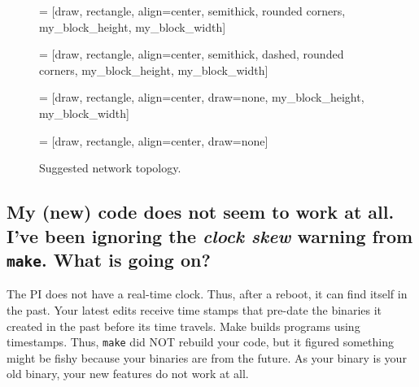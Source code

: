 \documentclass{article}
\begin{document}
\begin{figure}[h!]
 = [draw, rectangle, align=center, semithick, rounded corners,
  my_block_height, my_block_width]

 = [draw, rectangle, align=center, semithick, dashed, rounded corners,
  my_block_height, my_block_width]

 = [draw, rectangle, align=center, draw=none,
  my_block_height, my_block_width]

 = [draw, rectangle, align=center, draw=none]

 \caption{Suggested network topology.}
  \label{fig:setup}
\end{figure}

\subsection{My (new) code does not seem to work at all. I've been ignoring the {\em clock skew} warning from {\tt make}. What is going on?}

The PI does not have a real-time clock. Thus, after a reboot, it can
find itself in the past. Your latest edits receive time stamps that
pre-date the binaries it created in the past before its time travels.
Make builds programs using timestamps. Thus, {\tt make} did NOT rebuild
your code, but it figured something might be fishy because your binaries
are from the future. As your binary is your old binary, your new features
do not work at all.
\end{document}
